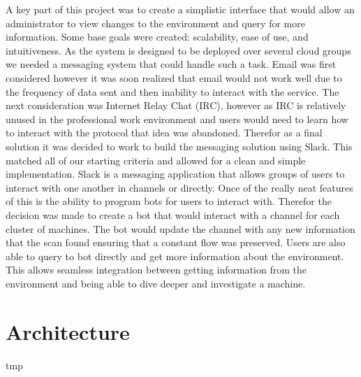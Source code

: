 \documentclass[12pt]{article}
\begin{document}
A key part of this project was to create a simplistic interface that would allow an administrator to view changes to the environment and query for more information. Some base goals were created: scalability, ease of use, and intuitiveness. As the system is designed to be deployed over several cloud groups we needed a messaging system that could handle such a task. Email was first considered however it was soon realized that email would not work well due to the frequency of data sent and then inability to interact with the service. The next consideration was Internet Relay Chat (IRC), however as IRC is relatively unused in the professional work environment and users would need to learn how to interact with the protocol that idea was abandoned. Therefor as a final solution it was decided to work to build the messaging solution using Slack. This matched all of our starting criteria and allowed for a clean and simple implementation. Slack is a messaging application that allows groups of users to interact with one another in channels or directly. Once of the really neat features of this is the ability to program bots for users to interact with. Therefor the decision was made to create a bot that would interact with a channel for each cluster of machines. The bot would update the channel with any new information that the scan found ensuring that a constant flow was preserved. Users are also able to query to bot directly and get more information about the environment. This allows seamless integration between getting information from the environment and being able to dive deeper and investigate a machine.



\section{Architecture}

tmp



\newpage


\end{document}
